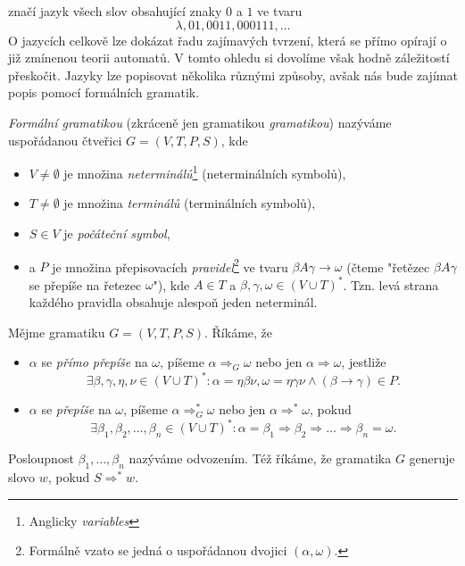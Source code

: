 značí jazyk všech slov obsahující znaky $0$ a $1$ ve tvaru
\[\lambda,01,0011,000111,\ldots\]
O jazycích celkově lze dokázat řadu zajímavých tvrzení, která se přímo opírají o již zmínenou teorii automatů. V tomto ohledu si dovolíme však hodně záležitostí přeskočit. Jazyky lze popisovat několika různými způsoby, avšak nás bude zajímat popis pomocí formálních gramatik.
\begin{definition}\label{def:formalni-gramatika}
    \emph{Formální gramatikou} (zkráceně jen gramatikou \emph{gramatikou}) nazýváme uspořádanou čtveřici $G=(V,T,P,S)$, kde
    \begin{itemize}
        \item $V\neq\emptyset$ je množina \emph{neterminálů}\footnote{Anglicky \emph{variables}} (neterminálních symbolů),
        \item $T\neq\emptyset$ je množina \emph{terminálů} (terminálních symbolů),
        \item $S\in V$ je \emph{počáteční symbol},
        \item a $P$ je množina přepisovacích \emph{pravidel}\footnote{Formálně vzato se jedná o uspořádanou dvojici $(\alpha,\omega)$.} ve tvaru $\beta A\gamma\to\omega$ (čteme "řetězec $\beta A\gamma$ se přepíše na řetezec $\omega$"), kde $A\in T$ a $\beta,\gamma,\omega\in(V\cup T)^*$. Tzn. levá strana každého pravidla obsahuje alespoň jeden neterminál.
    \end{itemize}
\end{definition}
\begin{definition}\label{def:odvozeni-slova-v-gramatice}
    Mějme gramatiku $G=(V,T,P,S)$. Říkáme, že
    \begin{itemize}
        \item $\alpha$ se \emph{přímo přepíše} na $\omega$, píšeme $\alpha\Rightarrow_G\omega$ nebo jen $\alpha\Rightarrow\omega$, jestliže
        \[\exists\beta,\gamma,\eta,\nu\in(V\cup T)^*: \alpha=\eta\beta\nu,\omega=\eta\gamma\nu\land(\beta\to\gamma)\in P.\]
        \item $\alpha$ se \emph{přepíše} na $\omega$, píšeme $\alpha\Rightarrow_G^*\omega$ nebo jen $\alpha\Rightarrow^*\omega$, pokud
        \[\exists\beta_1,\beta_2,\ldots,\beta_n\in(V\cup T)^*:\alpha=\beta_1\Rightarrow\beta_2\Rightarrow\dots\Rightarrow\beta_n=\omega.\]
    \end{itemize}
    Posloupnost $\beta_1,\ldots,\beta_n$ nazýváme odvozením. Též říkáme, že gramatika $G$ generuje slovo $w$, pokud $S\Rightarrow^* w$.
\end{definition}
